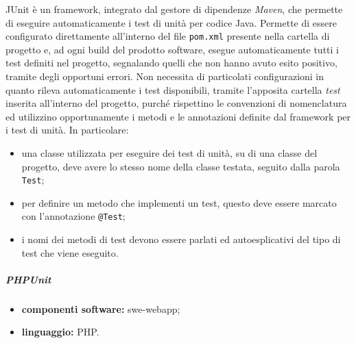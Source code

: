 				JUnit è un framework, integrato dal gestore di dipendenze \textit{Maven}, che permette di eseguire automaticamente i test di unità per codice Java.
				\newline
				Permette di essere configurato direttamente all'interno del file \verb!pom.xml! presente nella cartella di progetto e, ad ogni build del prodotto software, esegue automaticamente tutti i test definiti nel progetto, segnalando quelli che non hanno avuto esito positivo, tramite degli opportuni errori.
				\newline
				Non necessita di particolati configurazioni in quanto rileva automaticamente i test disponibili, tramite l'apposita cartella \textit{test} inserita all'interno del progetto, purché rispettino le convenzioni di nomenclatura ed utilizzino opportunamente i metodi e le annotazioni definite dal framework per i test di unità. In particolare:
				\begin{itemize}
					\item una classe utilizzata per eseguire dei test di unità, su di una classe del progetto, deve avere lo stesso nome della classe testata, seguito dalla parola \verb!Test!;
					\item per definire un metodo che implementi un test, questo deve essere marcato con l'annotazione \verb!@Test!;
					\item i nomi dei metodi di test devono essere parlati ed autoesplicativi del tipo di test che viene eseguito.
				\end{itemize}
		
			\subparagraph{PHPUnit}
			
				\begin{itemize}
					\item \textbf{componenti software:} swe-webapp;
					\item \textbf{linguaggio:} PHP.
				\end{itemize}
				
